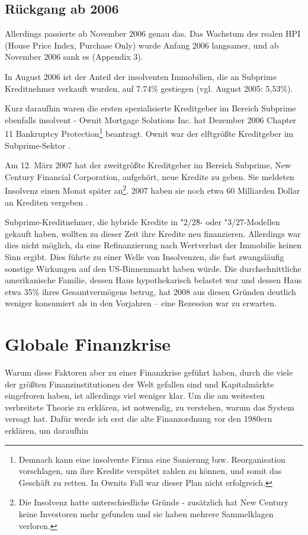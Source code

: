 \documentclass[a4paper,11pt]{report}
\begin{document}
\section{R\"uckgang ab 2006}
Allerdings passierte ab November 2006 genau das.
Das Wachstum des realen HPI (House Price Index,
Purchase Only) wurde Anfang 2006 langsamer, und
ab November 2006 sank es (Appendix 3).

In August 2006 ist der Anteil der insolventen
Immobilien, die an Subprime Kreditnehmer verkauft wurden,
auf 7.74\% gestiegen (vgl. August 2005: 5,53\%).

Kurz daraufhin waren die ersten spezialisierte
Kreditgeber im Bereich Subprime ebenfalls insolvent - 
Ownit Mortgage Solutions Inc. hat Dezember 2006 Chapter 11
Bankruptcy Protection\footnote{Demnach kann eine insolvente
Firma eine Sanierung bzw. Reorganisation vorschlagen,
um ihre Kredite versp\"atet zahlen zu k\"onnen, und somit
das Gesch\"aft zu retten. In Ownits Fall war dieser Plan nicht
erfolgreich.} beantragt. Ownit war der elftgrößte Kreditgeber
im Subprime-Sektor \parencite{wsjdoss}. 

Am 12. M\"arz 2007 hat der zweitgr\"oßte Kreditgeber im Bereich
Subprime, New Century Financial Corporation, aufgeh\"ort, neue
Kredite zu geben. Sie meldeten Insolvenz einen Monat sp\"ater
an\footnote{Die Insolvenz hatte unterschiedliche Gr\"unde -
zus\"atzlich hat New Century keine Investoren mehr gefunden
und sie haben mehrere Sammelklagen verloren.}. 2007 haben sie noch
etwa 60 Milliarden Dollar an Krediten vergeben \parencite{nytcres}.

Subprime-Kreditnehmer, die hybride Kredite in "2/28\"\-- oder
"3/27\"\--Modellen gekauft haben, wollten zu dieser Zeit ihre Kredite neu finanzieren.
Allerdings war dies nicht m\"oglich, da eine Refinanzierung nach
Wertverlust der Immobilie keinen Sinn ergibt. Dies  f\"uhrte zu
einer Welle von Insolvenzen, die fast zwangsl\"aufig sonstige
Wirkungen auf den US-Binnenmarkt haben w\"urde.
Die durchschnittliche amerikanische Familie, dessen Haus
hypothekarisch belastet war und dessen Haus etwa 35\% ihres
Gesamtverm\"ogens betrug, hat 2008 aus diesen Gr\"unden deutlich weniger
konsumiert als in den Vorjahren -- eine Rezession war zu erwarten. 
\parencite[196]{acharyar}

\chapter{Globale Finanzkrise}
Warum diese Faktoren aber zu einer Finanzkrise gef\"uhrt haben,
durch die viele der gr\"oßten Finanzinstitutionen
der Welt gefallen sind und Kapitalm\"arkte eingefroren haben,
ist allerdings viel weniger klar. Um die am weitesten verbreitete
Theorie zu erkl\"aren, ist notwendig, zu verstehen, warum das
System versagt hat. Daf\"ur werde ich erst die alte Finanzordnung vor 
den 1980ern erkl\"aren, um daraufhin 
\end{document}
